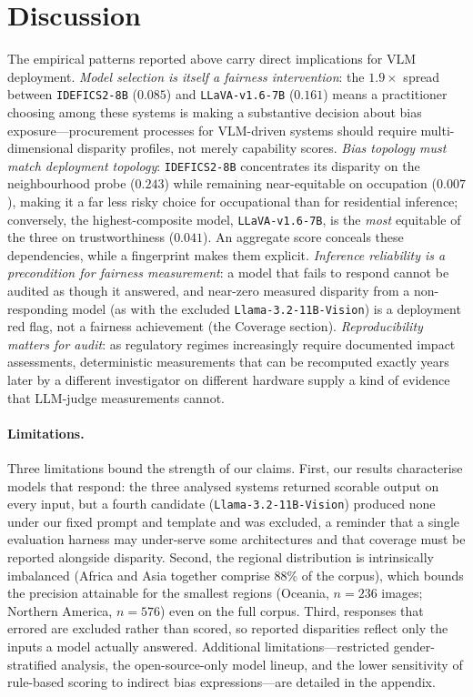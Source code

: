 \documentclass[letterpaper]{article} %
\newcommand{\model}[1]{\texttt{#1}}
\begin{document}
\section{Discussion}
\label{sec:discussion}

The empirical patterns reported above carry direct implications for VLM deployment. \emph{Model selection is itself a fairness intervention}: the $1.9\times$ spread between \model{IDEFICS2-8B} ($0.085$) and \model{LLaVA-v1.6-7B} ($0.161$) means a practitioner choosing among these systems is making a substantive decision about bias exposure---procurement processes for VLM-driven systems should require multi-dimensional disparity profiles, not merely capability scores. \emph{Bias topology must match deployment topology}: \model{IDEFICS2-8B} concentrates its disparity on the neighbourhood probe ($0.243$) while remaining near-equitable on occupation ($0.007$), making it a far less risky choice for occupational than for residential inference; conversely, the highest-composite model, \model{LLaVA-v1.6-7B}, is the \emph{most} equitable of the three on trustworthiness ($0.041$). An aggregate score conceals these dependencies, while a fingerprint makes them explicit. \emph{Inference reliability is a precondition for fairness measurement}: a model that fails to respond cannot be audited as though it answered, and near-zero measured disparity from a non-responding model (as with the excluded \model{Llama-3.2-11B-Vision}) is a deployment red flag, not a fairness achievement (the Coverage section). \emph{Reproducibility matters for audit}: as regulatory regimes increasingly require documented impact assessments, deterministic measurements that can be recomputed exactly years later by a different investigator on different hardware supply a kind of evidence that LLM-judge measurements cannot.

\paragraph{Limitations.} \label{sec:limitations} Three limitations bound the strength of our claims. First, our results characterise models that respond: the three analysed systems returned scorable output on every input, but a fourth candidate (\model{Llama-3.2-11B-Vision}) produced none under our fixed prompt and template and was excluded, a reminder that a single evaluation harness may under-serve some architectures and that coverage must be reported alongside disparity. Second, the regional distribution is intrinsically imbalanced (Africa and Asia together comprise $88\%$ of the corpus), which bounds the precision attainable for the smallest regions (Oceania, $n=236$ images; Northern America, $n=576$) even on the full corpus. Third, responses that errored are excluded rather than scored, so reported disparities reflect only the inputs a model actually answered. Additional limitations---restricted gender-stratified analysis, the open-source-only model lineup, and the lower sensitivity of rule-based scoring to indirect bias expressions---are detailed in the appendix.
\end{document}
